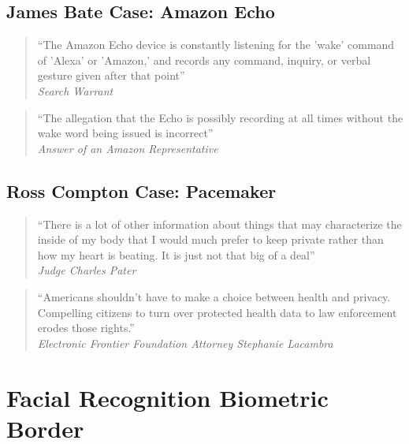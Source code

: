 \subsection{James Bate Case: Amazon Echo}

\begin{multicols}{2}
    \begin{quote}
        “The Amazon Echo device is constantly listening for the 'wake' command of 'Alexa' or 'Amazon,' and records any command, inquiry, or verbal gesture given after that point”  \\
        \textit{Search Warrant}
    \end{quote}

    \begin{quote}
        “The allegation that the Echo is possibly recording at all times without the wake word being issued is incorrect”  \\
        \textit{Answer of an Amazon Representative}
    \end{quote}
\end{multicols}

\subsection{Ross Compton Case: Pacemaker}

\begin{multicols}{2}
    \begin{quote}
        “There is a lot of other information about things that may characterize the inside of my body that I would much prefer to keep private rather than how my heart is beating. It is just not that big of a deal” \\ 
        \textit{Judge Charles Pater}
    \end{quote}

    \begin{quote}
        “Americans shouldn't have to make a choice between health and privacy. Compelling citizens to turn over protected health data to law enforcement erodes those rights.”  \\
        \textit{Electronic Frontier Foundation Attorney Stephanie Lacambra}
    \end{quote}
\end{multicols}

\section{Facial Recognition Biometric Border}

